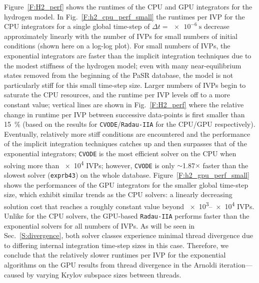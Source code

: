 \documentclass[preprint,review,11pt]{elsarticle}
\begin{document}
Figure~\ref{F:H2_perf} shows the runtimes of the CPU and GPU integrators for the hydrogen model.
In Fig.~\ref{F:h2_cpu_perf_small} the runtimes per IVP for the CPU integrators for a single global time-step of $\Delta t= \SI{e-6}{\second}$ decrease approximately linearly with the number of IVPs for small numbers of initial conditions (shown here on a log-log plot).
For small numbers of IVPs, the exponential integrators are faster than the implicit integration techniques due to the modest stiffness of the hydrogen model; even with many near-equilibrium states removed from the beginning of the PaSR database, the model is not particularly stiff for this small time-step size.
Larger numbers of IVPs begin to saturate the CPU resources, and the runtime per IVP levels off to a more constant value; vertical lines are shown in Fig.~\ref{F:H2_perf} where the relative change in runtime per IVP between successive data-points is first smaller than \SI{15}{\percent} (based on the results for \texttt{CVODE}\slash\texttt{Radau-IIA} for the CPU\slash GPU respectively).
Eventually, relatively more stiff conditions are encountered and the performance of the implicit integration techniques catches up and then surpasses that of the exponential integrators; \texttt{CVODE} is the most efficient solver on the CPU when solving more than \num{e4} IVPs; however, \texttt{CVODE} is only $\sim$\num{1.87}$\times$ faster than the slowest solver (\texttt{exprb43}) on the whole database.
Figure~\ref{F:h2_gpu_perf_small} shows the performances of the GPU integrators for the smaller global time-step size, which exhibit similar trends as the CPU solvers: a linearly decreasing solution cost that reaches a roughly constant value beyond \numrange{e3}{e4} IVPs.
Unlike for the CPU solvers, the GPU-based \texttt{Radau-IIA} performs faster than the exponential solvers for all numbers of IVPs.
As will be seen in Sec.~\ref{S:divergence}, both solver classes experience minimal thread divergence due to differing internal integration time-step sizes in this case.
Therefore, we conclude that the relatively slower runtimes per IVP for the exponential algorithms on the GPU results from thread divergence in the Arnoldi iteration---caused by varying Krylov subspace sizes between threads.
\end{document}
